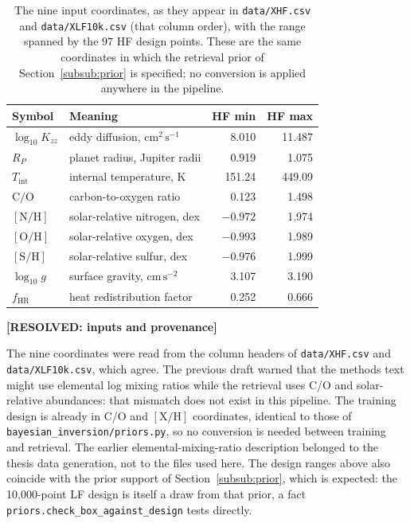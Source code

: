 \documentclass[12pt, letterpaper, oneside]{article}
\newcommand{\resolved}[2]{\par\begingroup\small\color{green!35!black}%
\noindent\textbf{[RESOLVED: #1]}\par\nobreak\noindent #2\par\endgroup}
\begin{document}
\begin{table}[t]
    \centering
    \small
    \caption{The nine input coordinates, as they appear in
    \texttt{data/XHF.csv} and \texttt{data/XLF10k.csv} (that column order),
    with the range spanned by the $97$ HF design points. These are the same
    coordinates in which the retrieval prior of
    Section~\ref{subsub:prior} is specified; no conversion is applied
    anywhere in the pipeline.}
    \label{tab:inputs}
    \begin{tabular}{llrr}
        \toprule
        Symbol & Meaning & HF min & HF max \\
        \midrule
        $\log_{10}K_{zz}$ & eddy diffusion, $\mathrm{cm^2\,s^{-1}}$ & 8.010 & 11.487 \\
        $R_P$             & planet radius, Jupiter radii            & 0.919 & 1.075 \\
        $T_{\mathrm{int}}$& internal temperature, K                 & 151.24 & 449.09 \\
        $\mathrm{C/O}$    & carbon-to-oxygen ratio                  & 0.123 & 1.498 \\
        $[\mathrm{N/H}]$  & solar-relative nitrogen, dex            & $-0.972$ & 1.974 \\
        $[\mathrm{O/H}]$  & solar-relative oxygen, dex              & $-0.993$ & 1.989 \\
        $[\mathrm{S/H}]$  & solar-relative sulfur, dex              & $-0.976$ & 1.999 \\
        $\log_{10}g$      & surface gravity, $\mathrm{cm\,s^{-2}}$  & 3.107 & 3.190 \\
        $f_{\mathrm{HR}}$ & heat redistribution factor              & 0.252 & 0.666 \\
        \bottomrule
    \end{tabular}
\end{table}

\resolved{inputs and provenance}{The nine coordinates were read from the
column headers of \texttt{data/XHF.csv} and \texttt{data/XLF10k.csv}, which
agree. The previous draft warned that the methods text might use elemental log
mixing ratios while the retrieval uses C/O and solar-relative abundances: that
mismatch does not exist in this pipeline. The training design is already in
C/O and $[\mathrm{X/H}]$ coordinates, identical to those of
\texttt{bayesian\_inversion/priors.py}, so no conversion is needed between
training and retrieval. The earlier elemental-mixing-ratio description
belonged to the thesis data generation, not to the files used here. The design
ranges above also coincide with the prior support of
Section~\ref{subsub:prior}, which is expected: the 10{,}000-point LF design is
itself a draw from that prior, a fact \texttt{priors.check\_box\_against\_design}
tests directly.}
\end{document}
